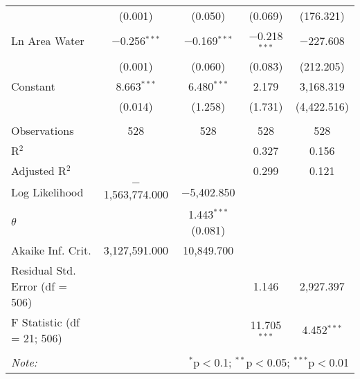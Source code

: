 \begin{table}[!htbp]
\begin{tabular}{@{\extracolsep{5pt}}lcccc}
  & (0.001) & (0.050) & (0.069) & (176.321) \\ 
  Ln Area Water & $-$0.256$^{***}$ & $-$0.169$^{***}$ & $-$0.218$^{***}$ & $-$227.608 \\ 
  & (0.001) & (0.060) & (0.083) & (212.205) \\ 
  Constant & 8.663$^{***}$ & 6.480$^{***}$ & 2.179 & 3,168.319 \\ 
  & (0.014) & (1.258) & (1.731) & (4,422.516) \\ 
 \hline \\[-1.8ex] 
Observations & 528 & 528 & 528 & 528 \\ 
R$^{2}$ &  &  & 0.327 & 0.156 \\ 
Adjusted R$^{2}$ &  &  & 0.299 & 0.121 \\ 
Log Likelihood & $-$1,563,774.000 & $-$5,402.850 &  &  \\ 
$\theta$ &  & 1.443$^{***}$  (0.081) &  &  \\ 
Akaike Inf. Crit. & 3,127,591.000 & 10,849.700 &  &  \\ 
Residual Std. Error (df = 506) &  &  & 1.146 & 2,927.397 \\ 
F Statistic (df = 21; 506) &  &  & 11.705$^{***}$ & 4.452$^{***}$ \\ 
\hline 
\hline \\[-1.8ex] 
\textit{Note:}  & \multicolumn{4}{r}{$^{*}$p$<$0.1; $^{**}$p$<$0.05; $^{***}$p$<$0.01} \\ 
\end{tabular} 
\end{table} 
